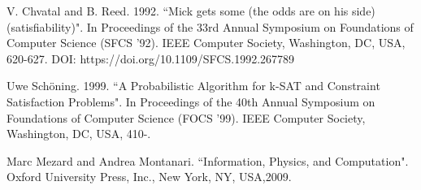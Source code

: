 \documentclass[letterpaper,english,11pt]{article}
\begin{document}
\begin{thebibliography}{7}
\nocite{*}
V. Chvatal and B. Reed. 1992. ``Mick gets some (the odds are on his side) (satisfiability)". In Proceedings of the 33rd Annual Symposium on Foundations of Computer Science (SFCS '92). IEEE Computer Society, Washington, DC, USA, 620-627. DOI: https://doi.org/10.1109/SFCS.1992.267789

Uwe Schöning. 1999. ``A Probabilistic Algorithm for k-SAT and Constraint Satisfaction Problems". In Proceedings of the 40th Annual Symposium on Foundations of Computer Science (FOCS '99). IEEE Computer Society, Washington, DC, USA, 410-.

Marc Mezard and Andrea Montanari. 
``Information, Physics, and Computation".
Oxford University Press, Inc., New York, NY, USA,2009. 
\end{thebibliography}
\end{document}
